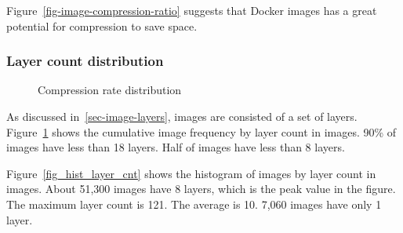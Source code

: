 Figure~\ref{fig-image-compression-ratio} suggests that Docker images has a great potential for compression to save space.

\subsubsection{Layer count distribution}

\begin{figure}[!t]
	\centering
	\caption{Compression rate distribution}
	\label{fig-layer-cnt}
\end{figure}

As discussed in~\ref{sec-image-layers}, images are consisted of a set of layers. Figure~\ref{fig-layer-cnt} shows the cumulative image frequency by layer count in images. 90\% of images have less than 18 layers. Half of images have less than 8 layers. 

Figure~\ref{fig_hist_layer_cnt} shows the histogram of images by layer count in images. About 51,300 images have 8 layers, which is the peak value in the figure. The maximum layer count is 121. The average is 10. 7,060 images have only 1 layer. 

